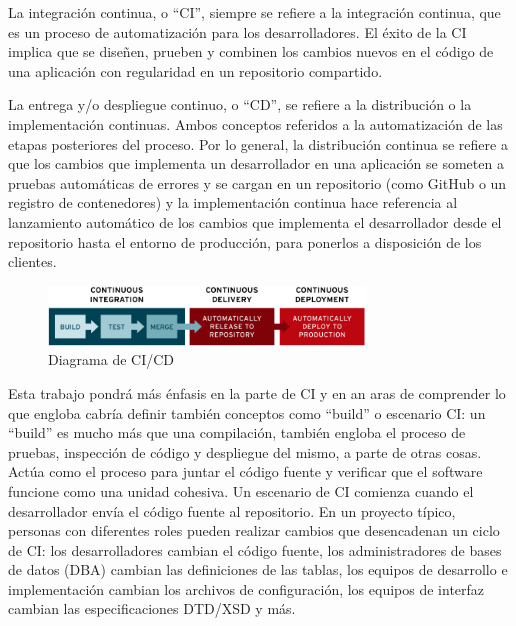 La integración continua, o ``CI'', siempre se refiere a la integración continua, que es un proceso de automatización para los desarrolladores. El éxito de la CI implica que se diseñen, prueben y combinen los cambios nuevos en el código de una aplicación con regularidad en un repositorio compartido.

La entrega y/o despliegue continuo, o ``CD'', se refiere a la distribución o la implementación continuas. Ambos conceptos referidos a la automatización de las etapas posteriores del proceso. Por lo general, la distribución continua se refiere a que los cambios que implementa un desarrollador en una aplicación se someten a pruebas automáticas de errores y se cargan en un repositorio (como GitHub o un registro de contenedores) y la implementación continua hace referencia al lanzamiento automático de los cambios que implementa el desarrollador desde el repositorio hasta el entorno de producción, para ponerlos a disposición de los clientes.

\begin{figure}[h]
    \centering
    \includegraphics[width=0.75\textwidth,clip=true]{imgs/ci-cd-flow-desktop.png}
    \caption{Diagrama de CI/CD}
\end{figure}

Esta trabajo pondrá más énfasis en la parte de CI y en an aras de comprender lo que engloba cabría definir también conceptos como ``build'' o escenario CI: un ``build'' es mucho más que una compilación, también engloba el proceso de pruebas, inspección de código y despliegue del mismo, a parte de otras cosas. Actúa como el proceso para juntar el código fuente y verificar que el software funcione como una unidad cohesiva. Un escenario de CI comienza cuando el desarrollador envía el código fuente al repositorio. En un proyecto típico, {personas} con diferentes roles pueden realizar cambios que desencadenan un ciclo de CI: los desarrolladores cambian el código fuente, los administradores de bases de datos (DBA) cambian las definiciones de las tablas, los equipos de desarrollo e implementación cambian los archivos de configuración, los equipos de interfaz cambian las especificaciones DTD/XSD y más.

